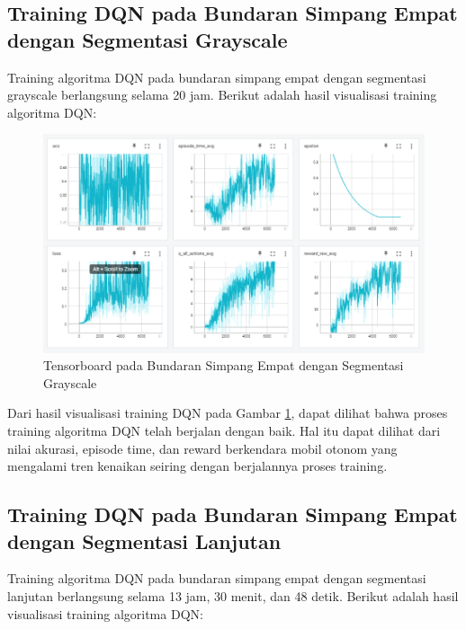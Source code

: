 \subsection{Training DQN pada Bundaran Simpang Empat dengan Segmentasi Grayscale}
\label{sec:training_dqn_bundaran_simpangempat_segmentasi_grayscale}

Training algoritma DQN pada bundaran simpang empat dengan segmentasi grayscale berlangsung selama 20 jam. Berikut adalah hasil visualisasi training algoritma DQN:

\begin{figure}[H] 
	\centering
	\includegraphics[width=1\linewidth]{images/tensorboard_bundaran_simpangempat_segmentasi_grayscale}
	\caption{Tensorboard pada Bundaran Simpang Empat dengan Segmentasi Grayscale}
	\label{fig:tensorboard_bundaran_simpangempat_segmentasi_grayscale}
\end{figure}

Dari hasil visualisasi training DQN pada Gambar \ref{fig:tensorboard_bundaran_simpangempat_segmentasi_grayscale}, dapat dilihat bahwa proses training algoritma DQN telah berjalan dengan baik. Hal itu dapat dilihat dari nilai akurasi, episode time, dan reward berkendara mobil otonom yang mengalami tren kenaikan seiring dengan berjalannya proses training.

\subsection{Training DQN pada Bundaran Simpang Empat dengan Segmentasi Lanjutan}
\label{sec:training_dqn_bundaran_simpangempat_segmentasi_hitam_putih}

Training algoritma DQN pada bundaran simpang empat dengan segmentasi lanjutan berlangsung selama 13 jam, 30 menit, dan 48 detik. Berikut adalah hasil visualisasi training algoritma DQN:

